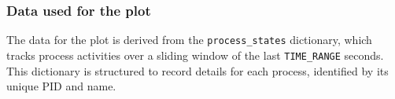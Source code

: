 \documentclass[12pt]{article}
\begin{document}
                    
                    



                                



            




\subsubsection{Data used for the plot}
The data for the plot is derived from the \texttt{process\_states} dictionary, which tracks process activities over a sliding window of the last \texttt{TIME\_RANGE} seconds. This dictionary is structured to record details for each process, identified by its unique PID and name. 
\end{document}

